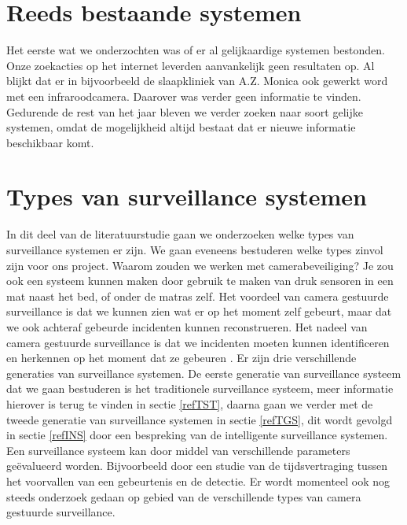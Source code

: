 \section{Reeds bestaande systemen}
\label{refRBS}
Het eerste wat we onderzochten was of er al gelijkaardige systemen bestonden. Onze zoekacties op het internet leverden aanvankelijk geen resultaten op. Al blijkt dat er in bijvoorbeeld de slaapkliniek van A.Z. Monica ook gewerkt word met een infraroodcamera. Daarover was verder geen informatie te vinden. Gedurende de rest van het jaar bleven we verder zoeken naar soort gelijke systemen, omdat de mogelijkheid altijd bestaat dat er nieuwe informatie beschikbaar komt.

\section{Types van surveillance systemen}
\label{refTVS}
In dit deel van de literatuurstudie gaan we onderzoeken welke types van surveillance systemen er zijn. We gaan eveneens bestuderen welke types zinvol zijn voor ons project. Waarom zouden we werken met camerabeveiliging? Je zou ook een systeem kunnen maken door gebruik te maken van druk sensoren in een mat naast het bed, of onder de matras zelf. Het voordeel van camera gestuurde surveillance is dat we kunnen zien wat er op het moment zelf gebeurt, maar dat we ook achteraf gebeurde incidenten kunnen reconstrueren. Het nadeel van camera gestuurde surveillance is dat we incidenten moeten kunnen identificeren en herkennen op het  moment dat ze gebeuren \cite{bibVTC3}. Er zijn drie verschillende generaties van surveillance systemen. De eerste generatie van surveillance systeem dat we gaan bestuderen is het traditionele surveillance systeem, meer informatie hierover is terug te vinden in sectie \ref{refTST}, daarna gaan we verder met de tweede generatie van surveillance systemen in sectie \ref{refTGS}, dit wordt gevolgd in sectie \ref{refINS} door een bespreking van de intelligente surveillance systemen.  Een surveillance systeem kan door middel van verschillende parameters ge\"evalueerd worden. Bijvoorbeeld door een studie van de tijdsvertraging tussen het voorvallen van een gebeurtenis en de detectie. Er wordt momenteel ook nog steeds onderzoek gedaan op gebied van de verschillende types van camera gestuurde surveillance.

